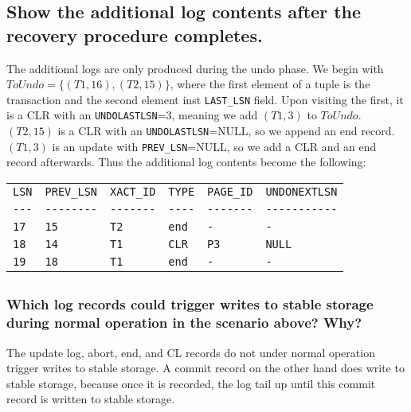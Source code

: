 \documentclass{article}
\begin{document}
\subsection{Show the additional log contents after the recovery procedure completes.}

The additional logs are only produced during the undo phase. We begin with $ToUndo=\{(T1,16),(T2,15)\}$, where the first element of a tuple is the transaction and the second element inst \verb|LAST_LSN| field. Upon visiting the first, it is a CLR with an \verb|UNDOLASTLSN|=3, meaning we add $(T1,3)$ to $ToUndo$. $(T2,15)$ is a CLR with an \verb|UNDOLASTLSN|=NULL, so we append an end record. $(T1,3)$ is an update with \verb|PREV_LSN|=NULL, so we add a CLR and an end record afterwards. Thus the additional log contents become the following:

\begin{table}[h]
    \centering
    \begin{tabular}{llllll}
        \verb|LSN| & \verb|PREV_LSN| & \verb|XACT_ID| & \verb|TYPE| & \verb|PAGE_ID| & \verb|UNDONEXTLSN| \\
        \verb|---| & \verb|--------| & \verb|-------| & \verb|----| & \verb|-------| & \verb|-----------| \\
        \verb|17| & \verb|15| & \verb|T2| & \verb|end| & \verb|-| & \verb|-| \\
        \verb|18| & \verb|14| & \verb|T1| & \verb|CLR| & \verb|P3| & \verb|NULL| \\
        \verb|19| & \verb|18| & \verb|T1| & \verb|end| & \verb|-| & \verb|-| \\
    \end{tabular}
\end{table}

\subsection{}
\subsubsection{Which log records could trigger writes to stable storage during normal operation in the scenario above? Why?}

The update log, abort, end, and CL records do not under normal operation trigger writes to stable storage. A commit record on the other hand does write to stable storage, because once it is recorded, the log tail up until this commit record is written to stable storage.
\end{document}
